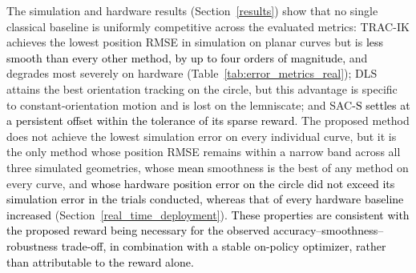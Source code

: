 \documentclass[preprint,12pt]{elsarticle}
\begin{document}
The simulation and hardware results (Section~\ref{results}) show that no single classical baseline is uniformly competitive across the evaluated metrics: TRAC-IK achieves the lowest position RMSE in simulation on planar curves but is \textcolor{black}{less smooth than every other method, by up to four orders of magnitude,} and degrades most severely on hardware (Table~\ref{tab:error_metrics_real}); DLS attains the best orientation tracking on the circle, but this advantage is specific
to constant-orientation motion and is lost on the lemniscate; and SAC\textcolor{black}{-S settles at a persistent offset within the tolerance of its sparse reward}. The proposed method does not achieve the lowest simulation error on every individual curve, but it is the only method whose position RMSE remains within a narrow band across all three simulated geometries, whose \textcolor{black}{mean} smoothness is the best of any method on every curve, and \textcolor{black}{whose hardware position error on the circle did not exceed its simulation error in the trials conducted, whereas that of every hardware baseline increased} (Section~\ref{real_time_deployment}). \textcolor{black}{These properties are consistent with the proposed reward being necessary for the observed accuracy--smoothness--robustness trade-off, in combination with a stable on-policy optimizer, rather than attributable to the reward alone.}
\end{document}
